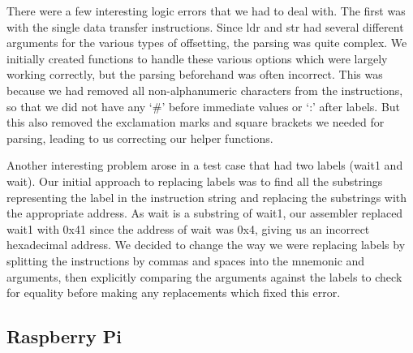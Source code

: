 \documentclass[11pt]{article}
\begin{document}
{}

{There were a few interesting logic errors that we had to deal with. The
first was with the single data transfer instructions. Since ldr and str
had several different arguments for the various types of offsetting, the
parsing was quite complex. We initially created functions to handle
these various options which were largely working correctly, but the
parsing beforehand was often incorrect. This was because we had removed
all non-alphanumeric characters from the instructions, so that we did
not have any `\#' before immediate values or `:' after labels. But this
also removed the exclamation marks and square brackets we needed for
parsing, leading to us correcting our helper functions.}

{}

{Another interesting problem arose in a test case that had two labels
(wait1 and wait). Our initial approach to replacing labels was to find
all the substrings representing the label in the instruction string and
replacing the substrings with the appropriate address. As wait is a
substring of wait1, our assembler replaced wait1 with 0x41 since the
address of wait was 0x4, giving us an incorrect hexadecimal address. We
decided to change the way we were replacing labels by splitting the
instructions by commas and spaces into the mnemonic and arguments, then
explicitly comparing the arguments against the labels to check for
equality before making any replacements which fixed this error.}

{}

\hypertarget{h.3dri9a37vvl5}{%
\subsection{\texorpdfstring{{Raspberry
Pi}}{Raspberry Pi}}\label{h.3dri9a37vvl5}}

{}
\end{document}
